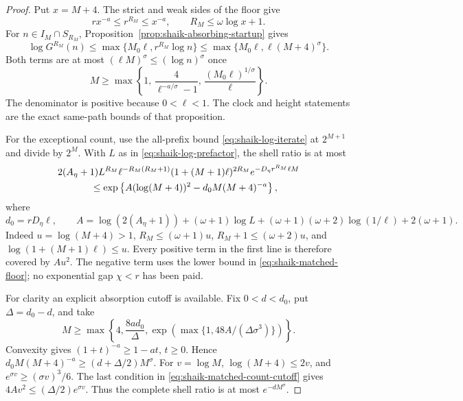 \documentclass[11pt]{article}
\theoremstyle{remark}\newtheorem{remark}[proposition]{Remark}
\begin{document}
\begin{proof}
Put \(x=M+4\). The strict and weak sides of the floor give
\begin{equation}\label{eq:shaik-matched-floor}
 r x^{-a}\le r^{R_M}\le x^{-a},\qquad
 R_M\le\omega\log x+1 .
\end{equation}
For \(n\in I_M\cap S_{R_M}\),
Proposition~\ref{prop:shaik-absorbing-startup} gives
\[
 \log G^{R_M}(n)
 \le\max\{M_0\ell,r^{R_M}\log n\}
 \le\max\{M_0\ell,\ell(M+4)^\sigma\}.
\]
Both terms are at most \((\ell M)^\sigma\le(\log n)^\sigma\)
once
\begin{equation}\label{eq:shaik-matched-landing-cutoff}
 M\ge
 \max\left\{1,\,
 \frac4{\ell^{-a/\sigma}-1},\,
 \frac{(M_0\ell)^{1/\sigma}}{\ell}\right\}.
\end{equation}
The denominator is positive because \(0<\ell<1\).
The clock and height statements are the exact same-path bounds
of that proposition.

For the exceptional count, use the all-prefix bound
\eqref{eq:shaik-log-iterate} at \(2^{M+1}\) and divide by \(2^M\).
With \(L\) as in \eqref{eq:shaik-log-prefactor}, the shell ratio is at most
\begin{align}
 &2(A_\eta+1)L^{R_M}\ell^{-R_M(R_M+1)}
        (1+(M+1)\ell)^{2R_M}
        e^{-D_\eta r^{R_M}\ell M}\nonumber\\
 &\hspace{12mm}\le
 \exp\left\{A(\log(M+4))^2
             -d_0 M(M+4)^{-a}\right\},\label{eq:shaik-matched-shell}
\end{align}
where
\[
 d_0=rD_\eta\ell,\qquad
 A=\log(2(A_\eta+1))+(\omega+1)\log L
    +(\omega+1)(\omega+2)\log(1/\ell)+2(\omega+1).
\]
Indeed \(u=\log(M+4)>1\), \(R_M\le(\omega+1)u\),
\(R_M+1\le(\omega+2)u\), and
\(\log(1+(M+1)\ell)\le u\).
Every positive term in the first line is therefore covered by
\(Au^2\). The negative term uses the lower bound in
\eqref{eq:shaik-matched-floor}; no exponential gap \(\chi<r\)
has been paid.

For clarity an explicit absorption cutoff is available.
Fix \(0<d<d_0\), put \(\Delta=d_0-d\), and take
\begin{equation}\label{eq:shaik-matched-count-cutoff}
 M\ge
 \max\left\{4,\frac{8ad_0}{\Delta},
       \exp\left(\max\{1,48A/(\Delta\sigma^3)\}\right)\right\}.
\end{equation}
Convexity gives \((1+t)^{-a}\ge1-at\), \(t\ge0\).
Hence \(d_0M(M+4)^{-a}\ge(d+\Delta/2)M^\sigma\).
For \(v=\log M\), \(\log(M+4)\le2v\), and
\(e^{\sigma v}\ge(\sigma v)^3/6\).
The last condition in \eqref{eq:shaik-matched-count-cutoff} gives
\(4Av^2\le(\Delta/2)e^{\sigma v}\).
Thus the complete shell ratio is at most \(e^{-dM^\sigma}\).


\end{proof}
\end{document}
